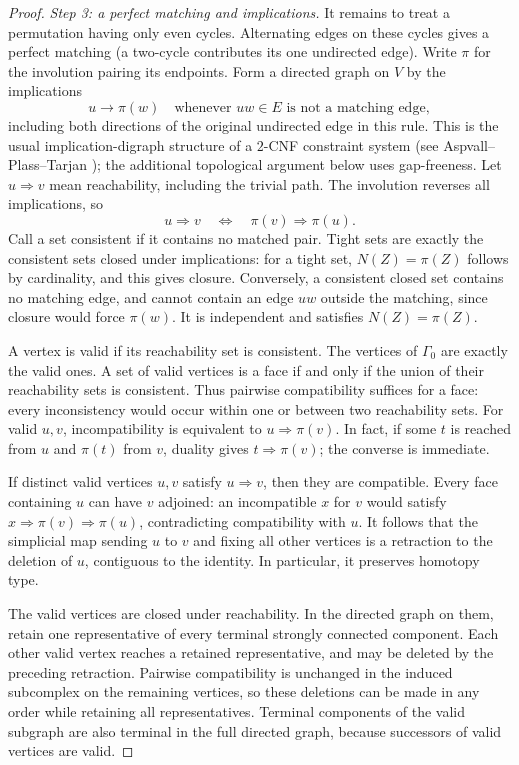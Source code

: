 \documentclass[11pt,a4paper]{article}
\theoremstyle{definition}
\newcommand{\G}{\Gamma}
\begin{document}
\begin{proof}
\emph{Step 3: a perfect matching and implications.} It remains to treat a permutation having only even cycles. Alternating edges on these cycles gives a perfect matching (a two-cycle contributes its one undirected edge). Write $\pi$ for the involution pairing its endpoints. Form a directed graph on $V$ by the implications
\[
 u\longrightarrow \pi(w) \quad\text{whenever } uw\in E\text{ is not a matching edge},
\]
including both directions of the original undirected edge in this rule. This is the usual implication-digraph structure of a $2$-CNF constraint system (see Aspvall--Plass--Tarjan \cite{APT}); the additional topological argument below uses gap-freeness. Let $u\Rightarrow v$ mean reachability, including the trivial path. The involution reverses all implications, so
\begin{equation}\label{eq:dual}
 u\Rightarrow v \quad\Longleftrightarrow\quad \pi(v)\Rightarrow\pi(u).
\end{equation}
Call a set consistent if it contains no matched pair. Tight sets are exactly the consistent sets closed under implications: for a tight set, $N(Z)=\pi(Z)$ follows by cardinality, and this gives closure. Conversely, a consistent closed set contains no matching edge, and cannot contain an edge $uw$ outside the matching, since closure would force $\pi(w)$. It is independent and satisfies $N(Z)=\pi(Z)$.

A vertex is valid if its reachability set is consistent. The vertices of $\G_0$ are exactly the valid ones. A set of valid vertices is a face if and only if the union of their reachability sets is consistent. Thus pairwise compatibility suffices for a face: every inconsistency would occur within one or between two reachability sets. For valid $u,v$, incompatibility is equivalent to $u\Rightarrow\pi(v)$. In fact, if some $t$ is reached from $u$ and $\pi(t)$ from $v$, duality gives $t\Rightarrow\pi(v)$; the converse is immediate.

If distinct valid vertices $u,v$ satisfy $u\Rightarrow v$, then they are compatible. Every face containing $u$ can have $v$ adjoined: an incompatible $x$ for $v$ would satisfy $x\Rightarrow\pi(v)\Rightarrow\pi(u)$, contradicting compatibility with $u$. It follows that the simplicial map sending $u$ to $v$ and fixing all other vertices is a retraction to the deletion of $u$, contiguous to the identity. In particular, it preserves homotopy type.

The valid vertices are closed under reachability. In the directed graph on them, retain one representative of every terminal strongly connected component. Each other valid vertex reaches a retained representative, and may be deleted by the preceding retraction. Pairwise compatibility is unchanged in the induced subcomplex on the remaining vertices, so these deletions can be made in any order while retaining all representatives. Terminal components of the valid subgraph are also terminal in the full directed graph, because successors of valid vertices are valid.


\end{proof}
\end{document}
